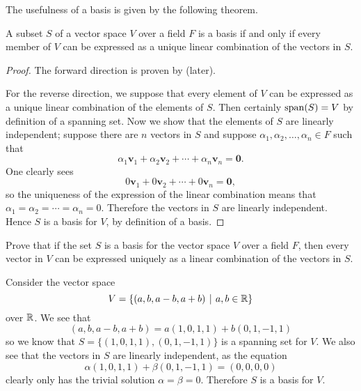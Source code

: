 The usefulness of a basis is given by the following theorem.

\begin{theorem}\label{thrm-basis-iff-has-unique-linear-combinatio}
    A subset $S$ of a vector space $V$ over a field $F$ is a basis if and only if every member of $V$ can be expressed as a unique linear combination of the vectors in $S$.
\end{theorem}
\begin{proof}
    The forward direction is proven by  (later).

    For the reverse direction, we suppose that every element of $V$ can be expressed as a unique linear combination of the elements of $S$. Then certainly $\mathrm{span}(S) = V$ by definition of a spanning set. Now we show that the elements of $S$ are linearly independent; suppose there are $n$ vectors in $S$ and suppose $\alpha_1, \alpha_2, \dots, \alpha_n \in F$ such that
    \[
        \alpha_1\mathbf{v}_1 + \alpha_2\mathbf{v}_2 + \cdots + \alpha_n\mathbf{v}_n = \mathbf{0}.
    \]
    One clearly sees
    \[
        0\mathbf{v}_1 + 0\mathbf{v}_2 + \cdots + 0\mathbf{v}_n = \mathbf{0},
    \]
    so the uniqueness of the expression of the linear combination means that $\alpha_1 = \alpha_2 = \cdots = \alpha_n = 0$. Therefore the vectors in $S$ are linearly independent. Hence $S$ is a basis for $V$, by definition of a basis.
\end{proof}

\begin{exercise}\label{exercise-basis-means-unique-linear-combination}
    Prove that if the set $S$ is a basis for the vector space $V$ over a field $F$, then every vector in $V$ can be expressed uniquely as a linear combination of the vectors in $S$.
\end{exercise}

\begin{example}
    Consider the vector space
    \[
        V = \{(a, b, a-b, a+b) \vert a, b \in \R\}
    \]
    over $\mathbb{R}$. We see that
    \[
        (a, b, a-b, a+b) = a(1, 0, 1, 1) + b(0, 1, -1, 1)
    \]
    so we know that $S = \{(1, 0, 1, 1), (0, 1, -1, 1)\}$ is a spanning set for $V$. We also see that the vectors in $S$ are linearly independent, as the equation
    \[
        \alpha(1, 0, 1, 1) + \beta(0, 1, -1, 1) = (0, 0, 0, 0)
    \]
    clearly only has the trivial solution $\alpha = \beta = 0$. Therefore $S$ is a basis for $V$.
\end{example}

